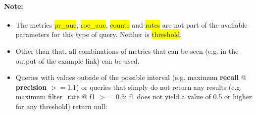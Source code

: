 \documentclass[12pt,a4paper]{article}
\begin{document}
\paragraph{Note: }
\begin{itemize}
\item The metrics \colorbox{yellow}{pr\_auc}, \colorbox{yellow}{roc\_auc}, \colorbox{yellow}{counts} and \colorbox{yellow}{rates} are not part of the available parameters for this type of query. Neither is \colorbox{yellow}{threshold}. %
\item Other than that, all combinations of metrics that can be seen (e.g. in the output of the example link) can be used. %
\item Queries with values outside of the possible interval (e.g. maximum \textbf{recall} @ \textbf{precision} $>= 1.1$) or queries that simply do not return any results (e.g. maximum filter\_rate @ f1 $>= 0.5$; f1 does not yield a value of 0.5 or higher for any threshold) return null:
\end{itemize}
\end{document}
